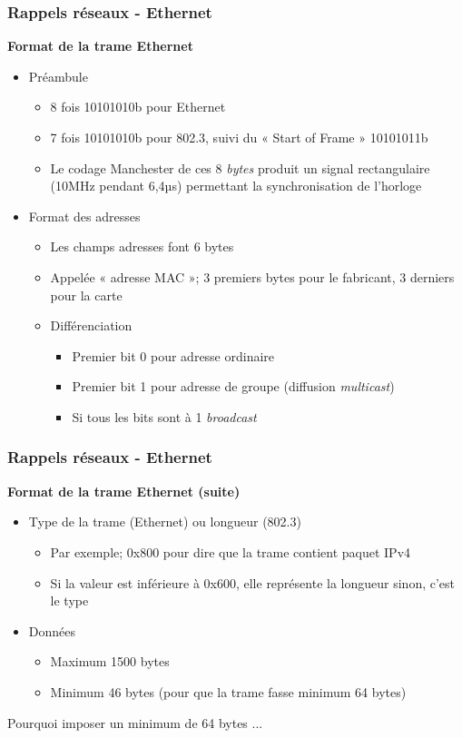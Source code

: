 \begin{frame}[fragile]
  \frametitle{Rappels réseaux - Ethernet}
{\large\bf Format de la trame Ethernet}
\begin{itemize}
	\item Préambule
	\begin{itemize}
		\item 8 fois 10101010b pour Ethernet
		\item 7 fois 10101010b pour 802.3, suivi du « Start of Frame » 10101011b
		\item Le codage Manchester de ces 8 \textit{bytes} produit un signal
		rectangulaire (10MHz pendant 6,4µs) permettant la synchronisation de l'horloge
	\end{itemize}
	\item Format des adresses
	\begin{itemize}
		\item Les champs adresses font 6 bytes
		\item Appelée « adresse MAC »; 3 premiers bytes pour le fabricant, 3 derniers pour la carte
		\item Différenciation
		\begin{itemize}
			\item Premier bit 0 pour adresse ordinaire
			\item Premier bit 1 pour adresse de groupe (diffusion \textit{multicast})
			\item Si tous les bits sont à 1 \textit{broadcast}
		\end{itemize}
	\end{itemize}
\end{itemize}
\end{frame}

\begin{frame}[fragile]
  \frametitle{Rappels réseaux - Ethernet}
{\large\bf Format de la trame Ethernet (suite)}
\begin{itemize}
	\item Type de la trame (Ethernet) ou longueur (802.3)
	\begin{itemize}
		\item Par exemple; 0x800 pour dire que la trame contient paquet IPv4
		\item Si la valeur est inférieure à 0x600, elle représente la longueur sinon, c'est le type
	\end{itemize}
	\item Données
	\begin{itemize}
		\item Maximum 1500 bytes
		\item Minimum 46 bytes (pour que la trame fasse minimum 64 bytes)
	\end{itemize}
\end{itemize}
\vspace{1cm}Pourquoi imposer un minimum de 64 bytes ... 
\end{frame}

